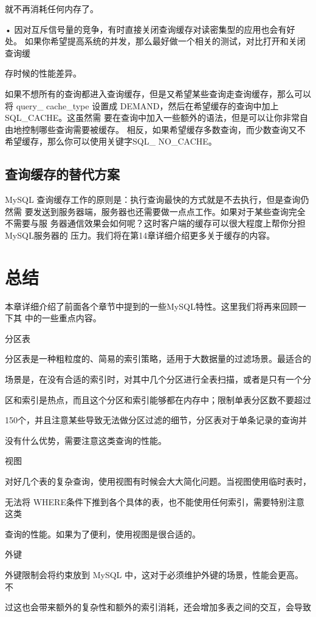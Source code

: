 就不再消耗任何内存了。

• 因对互斥信号量的竞争，有时直接关闭查询缓存对读密集型的应用也会有好处。
如果你希望提高系统的并发，那么最好做一个相关的测试，对比打开和关闭查询缓

存时候的性能差异。

如果不想所有的查询都进入查询缓存，但是又希望某些查询走查询缓存，那么可以将
query\_ cache\_type 设置成 DEMAND，然后在希望缓存的查询中加上SQL\_CACHE。这虽然需
要在查询中加入一些额外的语法，但是可以让你非常自由地控制哪些查询需要被缓存。
相反，如果希望缓存多数查询，而少数查询又不希望缓存，那么你可以使用关键字SQL\_
NO\_CACHE。

\subsection{查询缓存的替代方案}
MySQL 查询缓存工作的原则是：执行查询最快的方式就是不去执行，但是查询仍然需
要发送到服务器端，服务器也还需要做一点点工作。如果对于某些查询完全不需要与服
务器通信效果会如何呢？这时客户端的缓存可以很大程度上帮你分担MySQL服务器的
压力。我们将在第14章详细介绍更多关于缓存的内容。

\section{总结}
本章详细介绍了前面各个章节中提到的一些MySQL特性。这里我们将再来回顾一下其
中的一些重点内容。

分区表

分区表是一种粗粒度的、简易的索引策略，适用于大数据量的过滤场景。最适合的

场景是，在没有合适的索引时，对其中几个分区进行全表扫描，或者是只有一个分

区和索引是热点，而且这个分区和索引能够都在内存中；限制单表分区数不要超过

150个，并且注意某些导致无法做分区过滤的细节，分区表对于单条记录的查询并

没有什么优势，需要注意这类查询的性能。

视图

对好几个表的复杂查询，使用视图有时候会大大简化问题。当视图使用临时表时，

无法将 WHERE条件下推到各个具体的表，也不能使用任何索引，需要特别注意这类

查询的性能。如果为了便利，使用视图是很合适的。

外键

外键限制会将约束放到 MySQL 中，这对于必须维护外键的场景，性能会更高。不

过这也会带来额外的复杂性和额外的索引消耗，还会增加多表之间的交互，会导致

